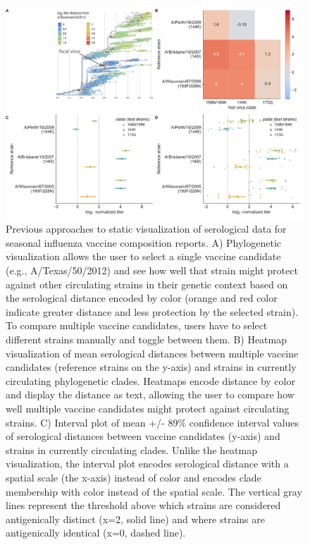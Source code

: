 \documentclass[utf8]{FrontiersinHarvard} %
\begin{document}
\begin{figure}[h!]
  \begin{center}
    \includegraphics[width=\textwidth]{figures/figure-1-static-titer-visualizations}
  \end{center}
  \caption{
    Previous approaches to static visualization of serological data for seasonal influenza vaccine composition reports.
A) Phylogenetic visualization \citep{NeherBedford2018} allows the user to select a single vaccine candidate (e.g., A/Texas/50/2012) and see how well that strain might protect against other circulating strains in their genetic context based on the serological distance encoded by color (orange and red color indicate greater distance and less protection by the selected strain).
To compare multiple vaccine candidates, users have to select different strains manually and toggle between them.
B) Heatmap visualization of mean serological distances between multiple vaccine candidates (reference strains on the y-axis) and strains in currently circulating phylogenetic clades.
Heatmaps encode distance by color and display the distance as text, allowing the user to compare how well multiple vaccine candidates might protect against circulating strains.
C) Interval plot of mean +/- 89\% confidence interval values of serological distances between vaccine candidates (y-axis) and strains in currently circulating clades.
Unlike the heatmap visualization, the interval plot encodes serological distance with a spatial scale (the x-axis) instead of color and encodes clade membership with color instead of the spatial scale.
The vertical gray lines represent the threshold above which strains are considered antigenically distinct (x=2, solid line) and where strains are antigenically identical (x=0, dashed line).
}
\end{figure}
\end{document}

